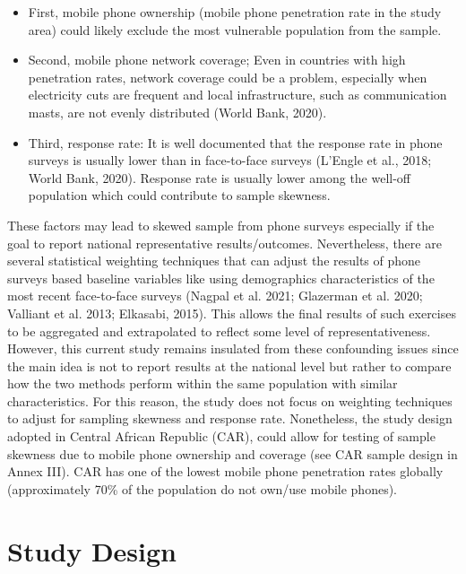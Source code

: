 \documentclass[11pt,harvard]{article}
\begin{document}
	\begin{itemize}[label=--, left=1.5em]
		\item[1]	First, mobile phone ownership (mobile phone penetration rate in the study area) could likely exclude the most vulnerable population from the sample. 
		
		\item[2]	Second, mobile phone network coverage; Even in countries with high penetration rates, network coverage could be a problem, especially when electricity cuts are frequent and local infrastructure, such as communication masts, are not evenly distributed (World Bank, 2020).
		
		\item[3]	Third, response rate: It is well documented that the response rate in phone surveys is usually lower than in face-to-face surveys (L’Engle et al., 2018; World Bank, 2020). Response rate is usually lower among the well-off population which could contribute to sample skewness.
	\end{itemize}
	
These factors may lead to skewed sample from phone surveys especially if the goal to report national representative results/outcomes. Nevertheless, there are several statistical weighting techniques that can adjust the results of phone surveys based baseline variables like using demographics characteristics of the most recent face-to-face surveys (Nagpal et al. 2021; Glazerman et al. 2020; Valliant et al. 2013; Elkasabi, 2015). This allows the final results of such exercises to be aggregated and extrapolated to reflect some level of representativeness. However, this current study remains insulated from these confounding issues since the main idea is not to report results at the national level but rather to compare how the two methods perform within the same population with similar characteristics. For this reason, the study does not focus on weighting techniques to adjust for sampling skewness and response rate. Nonetheless, the study design adopted in Central African Republic (CAR), could allow for testing of sample skewness due to mobile phone ownership and coverage (see CAR sample design in Annex III). CAR has one of the lowest mobile phone penetration rates globally (approximately 70\% of the population do not own/use mobile phones).
	
\pagebreak
	

\section{Study Design}
	
\end{document}
